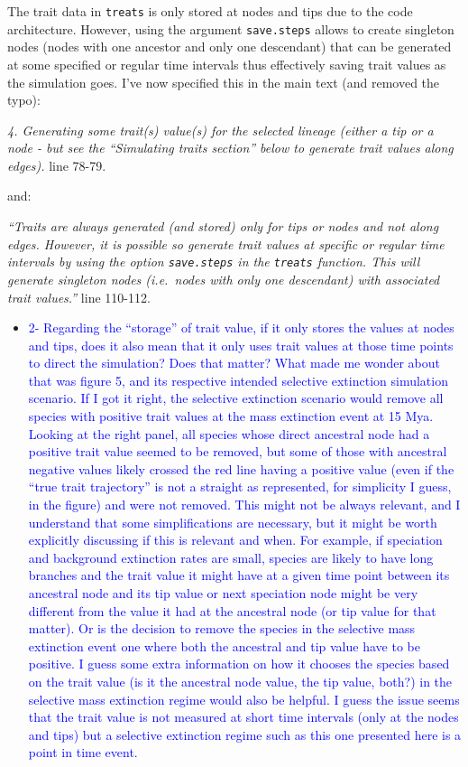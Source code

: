 \documentclass[
]{article}
\providecommand{\tightlist}{%
  \setlength{\itemsep}{0pt}\setlength{\parskip}{0pt}}
\begin{document}
The trait data in \texttt{treats} is only stored at nodes and tips due
to the code architecture. However, using the argument
\texttt{save.steps} allows to create singleton nodes (nodes with one
ancestor and only one descendant) that can be generated at some
specified or regular time intervals thus effectively saving trait values
as the simulation goes. I've now specified this in the main text (and
removed the typo):

\emph{4. Generating some trait(s) value(s) for the selected lineage
(either a tip or a node - but see the ``Simulating traits section''
below to generate trait values along edges).} line 78-79.

and:

\emph{``Traits are always generated (and stored) only for tips or nodes
and not along edges. However, it is possible so generate trait values at
specific or regular time intervals by using the option
\texttt{save.steps} in the \texttt{treats} function. This will generate
singleton nodes (i.e.~nodes with only one descendant) with associated
trait values.''} line 110-112.

\begin{itemize}
\tightlist
\item
  \textcolor{blue}{2- Regarding the ``storage'' of trait value, if it only stores the
  values at nodes and tips, does it also mean that it only uses trait
  values at those time points to direct the simulation? Does that
  matter? What made me wonder about that was figure 5, and its
  respective intended selective extinction simulation scenario. If I got
  it right, the selective extinction scenario would remove all species
  with positive trait values at the mass extinction event at 15 Mya.
  Looking at the right panel, all species whose direct ancestral node
  had a positive trait value seemed to be removed, but some of those
  with ancestral negative values likely crossed the red line having a
  positive value (even if the ``true trait trajectory'' is not a
  straight as represented, for simplicity I guess, in the figure) and
  were not removed. This might not be always relevant, and I understand
  that some simplifications are necessary, but it might be worth
  explicitly discussing if this is relevant and when. For example, if
  speciation and background extinction rates are small, species are
  likely to have long branches and the trait value it might have at a
  given time point between its ancestral node and its tip value or next
  speciation node might be very different from the value it had at the
  ancestral node (or tip value for that matter). Or is the decision to
  remove the species in the selective mass extinction event one where
  both the ancestral and tip value have to be positive. I guess some
  extra information on how it chooses the species based on the trait
  value (is it the ancestral node value, the tip value, both?) in the
  selective mass extinction regime would also be helpful. I guess the
  issue seems that the trait value is not measured at short time
  intervals (only at the nodes and tips) but a selective extinction
  regime such as this one presented here is a point in time event. }
\end{itemize}
\end{document}
